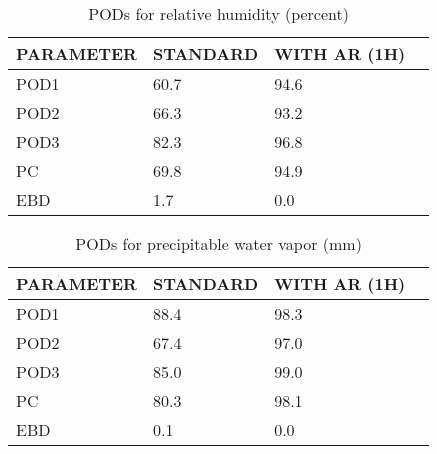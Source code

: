 \documentclass[11pt,english]{article}
\begin{document}
\begin{table}[]
\begin{center}
\begin{tabular}{|l|l|l|l|}
\hline
\multicolumn{1}{|c|}{\cellcolor[HTML]{C0C0C0}\textbf{PARAMETER}} & \multicolumn{1}{c|}{\cellcolor[HTML]{C0C0C0}\textbf{STANDARD}} & \multicolumn{1}{c|}{\cellcolor[HTML]{C0C0C0}\textbf{WITH AR (1H)}} \\
\hline
\cellcolor[HTML]{C0C0C0}POD1  & 60.7                                & 94.6         \\
\cellcolor[HTML]{C0C0C0}POD2  & 66.3                                & 93.2         \\
\cellcolor[HTML]{C0C0C0}POD3  & 82.3                                & 96.8         \\
\cellcolor[HTML]{C0C0C0}PC    & 69.8                                  & 94.9           \\
\cellcolor[HTML]{C0C0C0}EBD   & 1.7                                 & 0.0          \\
\hline
\end{tabular}
\caption{PODs for relative humidity (percent)}
\end{center}
\end{table}
\begin{table}[]
\begin{center}
\begin{tabular}{|l|l|l|l|}
\hline
\multicolumn{1}{|c|}{\cellcolor[HTML]{C0C0C0}\textbf{PARAMETER}} & \multicolumn{1}{c|}{\cellcolor[HTML]{C0C0C0}\textbf{STANDARD}} & \multicolumn{1}{c|}{\cellcolor[HTML]{C0C0C0}\textbf{WITH AR (1H)}} \\
\hline
\cellcolor[HTML]{C0C0C0}POD1  & 88.4                                & 98.3         \\
\cellcolor[HTML]{C0C0C0}POD2  & 67.4                                & 97.0         \\
\cellcolor[HTML]{C0C0C0}POD3  & 85.0                                & 99.0         \\
\cellcolor[HTML]{C0C0C0}PC    & 80.3                                  & 98.1           \\
\cellcolor[HTML]{C0C0C0}EBD   & 0.1                                 & 0.0          \\
\hline
\end{tabular}
\caption{PODs for precipitable water vapor (mm)}
\end{center}
\end{table}
\end{document}
